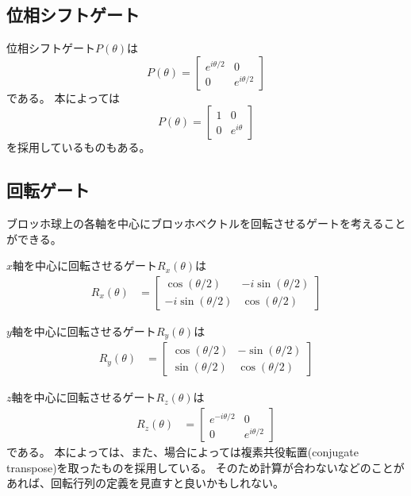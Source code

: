 \subsection{位相シフトゲート}

位相シフトゲート$P(\theta)$は
\begin{equation}
  P(\theta) =
  \begin{bmatrix}
    e^{i\theta/2} & 0 \\
    0              & e^{i\theta/2}
  \end{bmatrix}
\end{equation}
である。
本によっては
\begin{equation}
  P(\theta) =
  \begin{bmatrix}
    1 & 0 \\
    0 & e^{i\theta}
  \end{bmatrix}
\end{equation}
を採用しているものもある。

\subsection{回転ゲート}
ブロッホ球上の各軸を中心にブロッホベクトルを回転させるゲートを考えることができる。

$x$軸を中心に回転させるゲート$R_x(\theta)$は
\begin{align} \label{eq:Rx}
  R_x(\theta) &=
  \begin{bmatrix}
    \cos(\theta/2) & -i\sin(\theta/2) \\
    -i\sin(\theta/2) & \cos(\theta/2)
  \end{bmatrix}
\end{align}

$y$軸を中心に回転させるゲート$R_y(\theta)$は
\begin{align} \label{eq:Ry}
  R_y(\theta) &=
  \begin{bmatrix}
    \cos(\theta/2) & -\sin(\theta/2) \\
    \sin(\theta/2) & \cos(\theta/2)
  \end{bmatrix}
\end{align}

$z$軸を中心に回転させるゲート$R_z(\theta)$は
\begin{align} \label{eq:Rz}
  R_z(\theta) &=
  \begin{bmatrix}
    e^{-i\theta/2} & 0 \\
    0              & e^{i\theta/2}
  \end{bmatrix}
\end{align}
である。
本によっては、また、場合によっては複素共役転置(conjugate transpose)を取ったものを採用している。
そのため計算が合わないなどのことがあれば、回転行列の定義を見直すと良いかもしれない。

